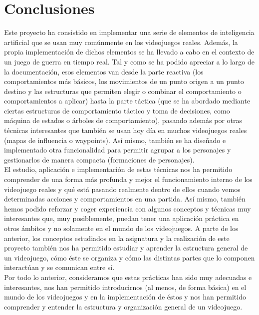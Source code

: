\medskip
\section{Conclusiones}

Este proyecto ha consistido en implementar una serie de elementos de inteligencia artificial que se usan muy comúnmente en los videojuegos reales. Además, la propia implementación de dichos elementos se ha llevado a cabo en el contexto de un juego de guerra en tiempo real. Tal y como se ha podido apreciar a lo largo de la documentación, esos elementos van desde la parte reactiva (los comportamientos más básicos, los movimientos de un punto origen a un punto destino y las estructuras que permiten elegir o combinar el comportamiento o comportamientos a aplicar) hasta la parte táctica (que se ha abordado mediante ciertas estructuras de comportamiento táctico y toma de decisiones, como máquina de estados o árboles de comportamiento), pasando además por otras técnicas interesantes que también se usan hoy día en muchos videojuegos reales (mapas de influencia o waypoints). Así mismo, también se ha diseñado e implementado otra funcionalidad para permitir agrupar a los personajes y gestionarlos de manera compacta (formaciones de personajes). \\

El estudio, aplicación e implementación de estas técnicas nos ha permitido comprender de una forma más profunda y mejor el funcionamiento interno de los videojuego reales y qué está pasando realmente dentro de ellos cuando vemos determinadas acciones y comportamientos en una partida. Así mismo, también hemos podido reforzar y coger experiencia con algunos conceptos y técnicas muy interesantes que, muy posiblemente, puedan tener una aplicación práctica en otros ámbitos y no solamente en el mundo de los videojuegos. A parte de los anterior, los conceptos estudiados en la asignatura y la realización de este proyecto también nos ha permitido estudiar y aprender la estructura general de un videojuego, cómo éste se organiza y cómo las distintas partes que lo componen interactúan y se comunican entre sí. \\

Por todo lo anterior, consideramos que estas prácticas han sido muy adecuadas e interesantes, nos han permitido introducirnos (al menos, de forma básica) en el mundo de los videojuegos y en la implementación de éstos y nos han permitido comprender y entender la estructura y organización general de un videojuego.

